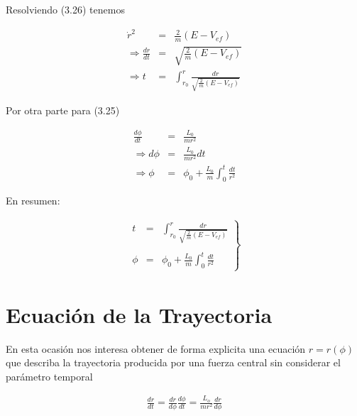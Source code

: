 \documentclass[12pt]{report}
\begin{document}
Resolviendo (3.26) tenemos

\begin{eqnarray}
\dot{r}^2 &=& \frac{2}{m} \left( E - V_{ef} \right) \\
\Rightarrow \frac{dr}{dt}&=& \sqrt{\frac{2}{m} \left( E - V_{ef} \right)} \\
\Rightarrow t&=&\displaystyle \int_{r_0}^{r} \frac{dr}{\sqrt{\frac{2}{m}\left( E-V_{ef} \right)}}
\end{eqnarray}





Por otra parte para  (3.25) 

\begin{eqnarray}
\frac{d\phi}{dt}&=& \frac{L_0}{mr^2} \\
\Rightarrow d\phi&=& \frac{L_0}{mr^2} dt \\
\Rightarrow \phi &=& \phi_0 +\frac{L_0}{m} \int_{0}^{t} \frac{dt}{r^2}
\end{eqnarray}

En resumen:


\begin{eqnarray}
\left.
\begin{matrix}
t&=&\displaystyle \int_{r_0}^{r} \frac{dr}{\sqrt{\frac{2}{m}\left( E-V_{ef} \right)}} \\ \\
\phi &=& \displaystyle \phi_0 +\frac{L_0}{m} \int_{0}^{t} \frac{dt}{r^2} 
\end{matrix}
\right\}
\end{eqnarray}














\section{Ecuación de la Trayectoria}


En esta ocasión nos interesa obtener de forma explicita  una ecuación $r=r(\phi)$ que describa la trayectoria producida por una fuerza central sin considerar el parámetro temporal  

\begin{eqnarray}
\frac{dr}{dt}=\frac{dr}{d\phi} \frac{d\phi}{dt}= \frac{L_o}{mr^2} \frac{dr}{d\phi}
\end{eqnarray}
\end{document}
